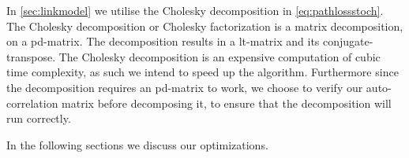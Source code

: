 

In \autoref{sec:linkmodel} we utilise the Cholesky decomposition in \autoref{eq:pathlossstoch}. The Cholesky decomposition or Cholesky factorization is a matrix decomposition, on a \gls{pd-matrix}. The decomposition results in a \gls{lt-matrix} and its \gls{conjugate-transpose}. The Cholesky decomposition is an expensive computation of cubic time complexity, as such we intend to speed up the algorithm. Furthermore since the decomposition requires an \gls{pd-matrix} to work, we choose to verify our auto-correlation matrix before decomposing it, to ensure that the decomposition will run correctly.

In the following sections we discuss our optimizations.








